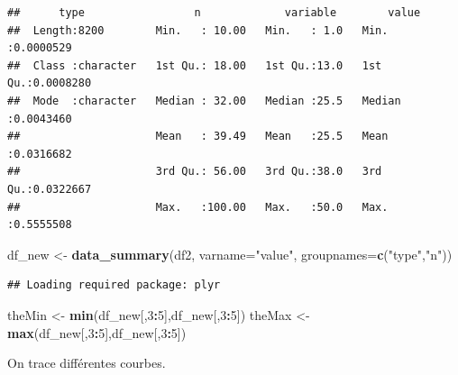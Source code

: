 \documentclass[
]{article}
\newenvironment{Shaded}{\begin{snugshade}}{\end{snugshade}}
\newcommand{\AttributeTok}[1]{\textcolor[rgb]{0.13,0.29,0.53}{#1}}
\newcommand{\DecValTok}[1]{\textcolor[rgb]{0.00,0.00,0.81}{#1}}
\newcommand{\FunctionTok}[1]{\textcolor[rgb]{0.13,0.29,0.53}{\textbf{#1}}}
\newcommand{\NormalTok}[1]{#1}
\newcommand{\OtherTok}[1]{\textcolor[rgb]{0.56,0.35,0.01}{#1}}
\newcommand{\SpecialCharTok}[1]{\textcolor[rgb]{0.81,0.36,0.00}{\textbf{#1}}}
\newcommand{\StringTok}[1]{\textcolor[rgb]{0.31,0.60,0.02}{#1}}
\begin{document}
\begin{verbatim}
##      type                 n             variable        value          
##  Length:8200        Min.   : 10.00   Min.   : 1.0   Min.   :0.0000529  
##  Class :character   1st Qu.: 18.00   1st Qu.:13.0   1st Qu.:0.0008280  
##  Mode  :character   Median : 32.00   Median :25.5   Median :0.0043460  
##                     Mean   : 39.49   Mean   :25.5   Mean   :0.0316682  
##                     3rd Qu.: 56.00   3rd Qu.:38.0   3rd Qu.:0.0322667  
##                     Max.   :100.00   Max.   :50.0   Max.   :0.5555508
\end{verbatim}

\begin{Shaded}
\begin{Highlighting}[]
\NormalTok{df\_new }\OtherTok{\textless{}{-}} \FunctionTok{data\_summary}\NormalTok{(df2, }\AttributeTok{varname=}\StringTok{"value"}\NormalTok{,}
                           \AttributeTok{groupnames=}\FunctionTok{c}\NormalTok{(}\StringTok{"type"}\NormalTok{,}\StringTok{"n"}\NormalTok{))}
\end{Highlighting}
\end{Shaded}

\begin{verbatim}
## Loading required package: plyr
\end{verbatim}

\begin{Shaded}
\begin{Highlighting}[]
\NormalTok{theMin }\OtherTok{\textless{}{-}} \FunctionTok{min}\NormalTok{(df\_new[,}\DecValTok{3}\SpecialCharTok{:}\DecValTok{5}\NormalTok{],df\_new[,}\DecValTok{3}\SpecialCharTok{:}\DecValTok{5}\NormalTok{])}
\NormalTok{theMax }\OtherTok{\textless{}{-}} \FunctionTok{max}\NormalTok{(df\_new[,}\DecValTok{3}\SpecialCharTok{:}\DecValTok{5}\NormalTok{],df\_new[,}\DecValTok{3}\SpecialCharTok{:}\DecValTok{5}\NormalTok{])}
\end{Highlighting}
\end{Shaded}

On trace différentes courbes.
\end{document}
